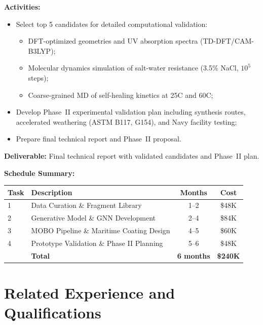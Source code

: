 \documentclass[11pt,letterpaper]{article}
\begin{document}
\textbf{Activities:}
\begin{itemize}[nosep]
  \item Select top 5 candidates for detailed computational validation:
    \begin{itemize}[nosep]
      \item DFT-optimized geometries and UV absorption spectra (TD-DFT/CAM-B3LYP);
      \item Molecular dynamics simulation of salt-water resistance (3.5\% NaCl,
        $10^5$ steps);
      \item Coarse-grained MD of self-healing kinetics at 25\textdegree C and
        60\textdegree C;
    \end{itemize}
  \item Develop Phase~II experimental validation plan including synthesis
    routes, accelerated weathering (ASTM B117, G154), and Navy facility testing;
  \item Prepare final technical report and Phase~II proposal.
\end{itemize}

\textbf{Deliverable:} Final technical report with validated candidates and
Phase~II plan.

\vspace{0.3cm}
\noindent\textbf{Schedule Summary:}

\begin{center}
\begin{tabular}{llcc}
\toprule
\textbf{Task} & \textbf{Description} & \textbf{Months} & \textbf{Cost} \\
\midrule
1 & Data Curation \& Fragment Library & 1--2 & \$48K \\
2 & Generative Model \& GNN Development & 2--4 & \$84K \\
3 & MOBO Pipeline \& Maritime Coating Design & 4--5 & \$60K \\
4 & Prototype Validation \& Phase II Planning & 5--6 & \$48K \\
\midrule
  & \textbf{Total} & \textbf{6 months} & \textbf{\$240K} \\
\bottomrule
\end{tabular}
\end{center}

\section{Related Experience and Qualifications}
\label{sec:qualifications}
\end{document}
